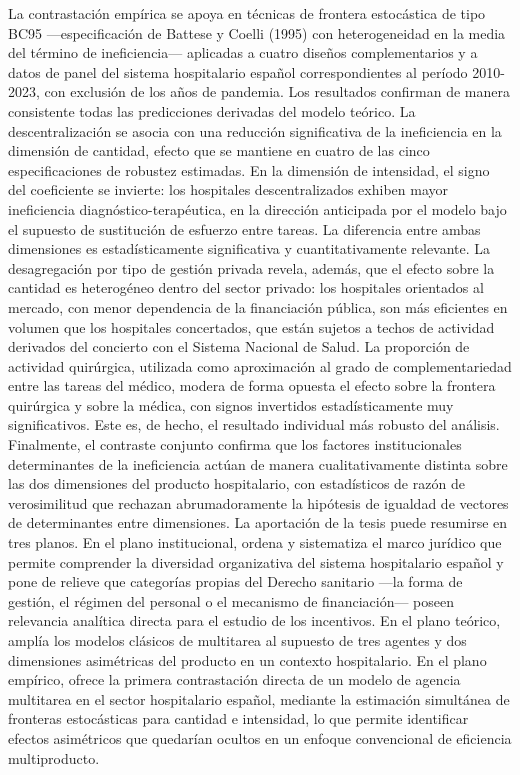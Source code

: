 La contrastación empírica se apoya en técnicas de frontera estocástica de tipo BC95 —especificación de Battese y Coelli (1995) con heterogeneidad en la media del término de ineficiencia— aplicadas a cuatro diseños complementarios y a datos de panel del sistema hospitalario español correspondientes al período 2010-2023, con exclusión de los años de pandemia. Los resultados confirman de manera consistente todas las predicciones derivadas del modelo teórico. La descentralización se asocia con una reducción significativa de la ineficiencia en la dimensión de cantidad, efecto que se mantiene en cuatro de las cinco especificaciones de robustez estimadas. En la dimensión de intensidad, el signo del coeficiente se invierte: los hospitales descentralizados exhiben mayor ineficiencia diagnóstico-terapéutica, en la dirección anticipada por el modelo bajo el supuesto de sustitución de esfuerzo entre tareas. La diferencia entre ambas dimensiones es estadísticamente significativa y cuantitativamente relevante. La desagregación por tipo de gestión privada revela, además, que el efecto sobre la cantidad es heterogéneo dentro del sector privado: los hospitales orientados al mercado, con menor dependencia de la financiación pública, son más eficientes en volumen que los hospitales concertados, que están sujetos a techos de actividad derivados del concierto con el Sistema Nacional de Salud. La proporción de actividad quirúrgica, utilizada como aproximación al grado de complementariedad entre las tareas del médico, modera de forma opuesta el efecto sobre la frontera quirúrgica y sobre la médica, con signos invertidos estadísticamente muy significativos. Este es, de hecho, el resultado individual más robusto del análisis. Finalmente, el contraste conjunto confirma que los factores institucionales determinantes de la ineficiencia actúan de manera cualitativamente distinta sobre las dos dimensiones del producto hospitalario, con estadísticos de razón de verosimilitud que rechazan abrumadoramente la hipótesis de igualdad de vectores de determinantes entre dimensiones.
La aportación de la tesis puede resumirse en tres planos. En el plano institucional, ordena y sistematiza el marco jurídico que permite comprender la diversidad organizativa del sistema hospitalario español y pone de relieve que categorías propias del Derecho sanitario —la forma de gestión, el régimen del personal o el mecanismo de financiación— poseen relevancia analítica directa para el estudio de los incentivos. En el plano teórico, amplía los modelos clásicos de multitarea al supuesto de tres agentes y dos dimensiones asimétricas del producto en un contexto hospitalario. En el plano empírico, ofrece la primera contrastación directa de un modelo de agencia multitarea en el sector hospitalario español, mediante la estimación simultánea de fronteras estocásticas para cantidad e intensidad, lo que permite identificar efectos asimétricos que quedarían ocultos en un enfoque convencional de eficiencia multiproducto.
